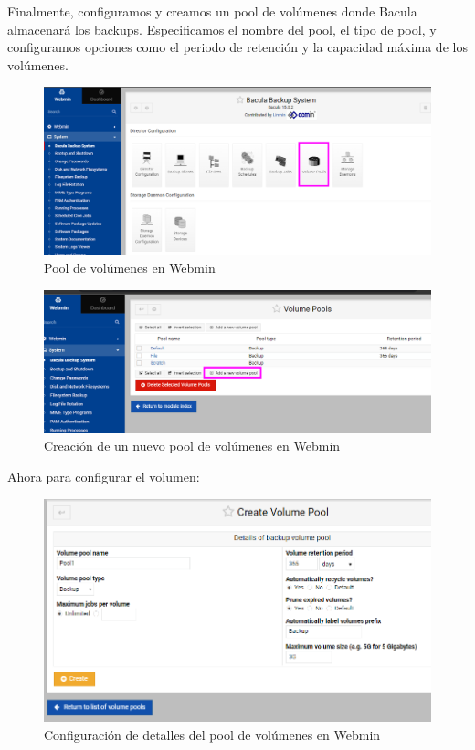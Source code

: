 Finalmente, configuramos y creamos un pool de volúmenes donde Bacula almacenará los backups. Especificamos el nombre del pool, el tipo de pool, y configuramos opciones como el periodo de retención y la capacidad máxima de los volúmenes.

\begin{figure}[H]
    \centering
    \includegraphics[width=0.5\linewidth]{instalacionBacula/pollv.png}
    \caption{Pool de volúmenes en Webmin}
\end{figure}

\begin{figure}[H]
    \centering
    \includegraphics[width=0.5\linewidth]{instalacionBacula/pool22.png}
    \caption{Creación de un nuevo pool de volúmenes en Webmin}
\end{figure}

Ahora para  configurar el volumen:
\begin{figure}[H]
    \centering
    \includegraphics[width=0.5\linewidth]{instalacionBacula/createVolumePool.png}
    \caption{Configuración de detalles del pool de volúmenes en Webmin}
\end{figure}